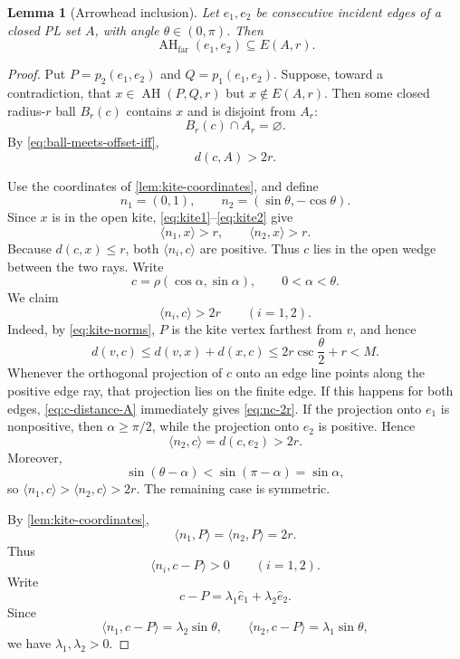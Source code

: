 \documentclass[11pt]{article}
\newtheorem{lemma}[theorem]{Lemma}
\newcommand{\AH}{\operatorname{AH}}
\newcommand{\AHfar}{\operatorname{AH}_{\mathrm{far}}}
\numberwithin{equation}{section}
\begin{document}
\begin{lemma}[Arrowhead inclusion]\label{lem:arrowhead-inclusion}
Let $e_1,e_2$ be consecutive incident edges of a closed PL set $A$, with angle $\theta\in(0,\pi)$. Then
\[
\boxed{\AHfar(e_1,e_2)\subseteq E(A,r).}
\]
\end{lemma}

\begin{proof}
Put $P=p_2(e_1,e_2)$ and $Q=p_1(e_1,e_2)$. Suppose, toward a contradiction, that $x\in\AH(P,Q,r)$ but $x\notin E(A,r)$. Then some closed radius-$r$ ball $B_r(c)$ contains $x$ and is disjoint from $A_r$:
\begin{equation}\label{eq:AH-ball-disjoint}
B_r(c)\cap A_r=\varnothing.
\end{equation}
By \eqref{eq:ball-meets-offset-iff},
\begin{equation}\label{eq:c-distance-A}
d(c,A)>2r.
\end{equation}

Use the coordinates of \cref{lem:kite-coordinates}, and define
\[
n_1=(0,1),
\qquad
n_2=(\sin\theta,-\cos\theta).
\]
Since $x$ is in the open kite, \eqref{eq:kite1}--\eqref{eq:kite2} give
\begin{equation}\label{eq:nx-r}
\langle n_1,x\rangle>r,
\qquad
\langle n_2,x\rangle>r.
\end{equation}
Because $d(c,x)\le r$, both $\langle n_i,c\rangle$ are positive. Thus $c$ lies in the open wedge between the two rays. Write
\[
c=\rho(\cos\alpha,\sin\alpha),
\qquad 0<\alpha<\theta.
\]
We claim
\begin{equation}\label{eq:nc-2r}
\langle n_i,c\rangle>2r
\qquad(i=1,2).
\end{equation}
Indeed, by \eqref{eq:kite-norms}, $P$ is the kite vertex farthest from $v$, and hence
\[
d(v,c)\le d(v,x)+d(x,c)
\le2r\csc\frac\theta2+r<M.
\]
Whenever the orthogonal projection of $c$ onto an edge line points along the positive edge ray, that projection lies on the finite edge. If this happens for both edges, \eqref{eq:c-distance-A} immediately gives \eqref{eq:nc-2r}. If the projection onto $e_1$ is nonpositive, then $\alpha\ge\pi/2$, while the projection onto $e_2$ is positive. Hence
\[
\langle n_2,c\rangle=d(c,e_2)>2r.
\]
Moreover,
\[
\sin(\theta-\alpha)<\sin(\pi-\alpha)=\sin\alpha,
\]
so $\langle n_1,c\rangle>\langle n_2,c\rangle>2r$. The remaining case is symmetric.

By \cref{lem:kite-coordinates},
\[
\langle n_1,P\rangle=\langle n_2,P\rangle=2r.
\]
Thus
\[
\langle n_i,c-P\rangle>0
\qquad(i=1,2).
\]
Write
\[
c-P=\lambda_1\widehat e_1+\lambda_2\widehat e_2.
\]
Since
\[
\langle n_1,c-P\rangle=\lambda_2\sin\theta,
\qquad
\langle n_2,c-P\rangle=\lambda_1\sin\theta,
\]
we have $\lambda_1,\lambda_2>0$.


\end{proof}
\end{document}
